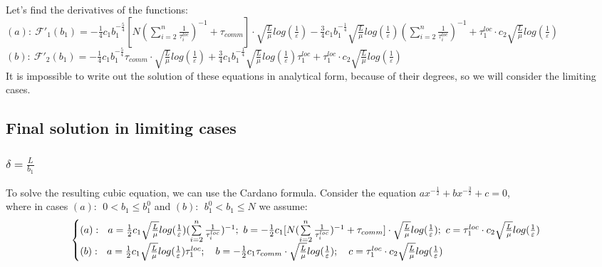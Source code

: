 \documentclass{article}
\begin{document}
Let's find the derivatives of the functions:\\
$(a): ~\mathcal{F'}_1(b_1) = -\frac{1}{4}c_1 b_1^{-\frac{5}{4}}  [N (\sum\limits_{i = 2}^{n} \frac{1}{\tau_i^{loc}})^{-1} + \tau_{comm}]\cdot 
\sqrt{\frac{L}{\mu}}log (\frac{1}{\varepsilon})  - 
\frac{3}{4} c_1 b_1^{-\frac{1}{4}}   \sqrt{\frac{L}{\mu}}log (\frac{1}{\varepsilon})(\sum\limits_{i = 2}^{n} \frac{1}{\tau_i^{loc}})^{-1} +
\tau_1^{loc}\cdot c_2  \sqrt{\frac{L}{\mu}}log (\frac{1}{\varepsilon})$ \\
$(b): ~\mathcal{F'}_2(b_1) = -\frac{1}{4}c_1 b_1^{-\frac{5}{4}} \tau_{comm}\cdot \sqrt{\frac{L}{\mu}}log (\frac{1}{\varepsilon}) + \frac{3}{4} c_1 b_1^{-\frac{1}{4}}  \sqrt{\frac{L}{\mu}}log (\frac{1}{\varepsilon})\tau_1^{loc}   + \tau_1^{loc}\cdot c_2  \sqrt{\frac{L}{\mu}}log (\frac{1}{\varepsilon})$\\

It is impossible to write out the solution of these equations in analytical form, because of their degrees, so we will consider the limiting cases.

\subsection{Final solution in limiting cases}
\subsubsection{$\delta = \frac{L}{b_1}$}\label{eq:3.4.1}
To solve the resulting cubic equation, we can use the Cardano formula.
Consider the equation $ax^{-\frac{1}{2}} + bx^{-\frac{3}{2}} + c = 0$,\\
where in cases $(a): ~ ~ 0 < b_1 \leq b_1^0 $ and $(b): ~ ~ b_1^0 <  b_1 \leq N$ we assume:
\begin{eqnarray}
\notag
    \begin{cases}
    (a): ~ ~ a = \frac{1}{2} c_1 \sqrt{\frac{L}{\mu}}log (\frac{1}{\varepsilon})(\sum\limits_{i = 2}^{n} \frac{1}{\tau_i^{loc}})^{-1}; ~
b = -\frac{1}{2} c_1 [N (\sum\limits_{i = 2}^{n} \frac{1}{\tau_i^{loc}})^{-1} + \tau_{comm}]\cdot 
\sqrt{\frac{L}{\mu}}log (\frac{1}{\varepsilon}); ~ 
c = \tau_1^{loc}\cdot c_2  \sqrt{\frac{L}{\mu}}log (\frac{1} {\varepsilon})
    \\
\notag
    (b): ~ ~ a = \frac{1}{2} c_1  \sqrt{\frac{L}{\mu}}log (\frac{1}{\varepsilon})\tau_1^{loc}; \quad 
b = -\frac{1}{2}c_1 \tau_{comm}\cdot \sqrt{\frac{L}{\mu}}log (\frac{1}{\varepsilon}); \quad 
c = \tau_1^{loc}\cdot c_2  \sqrt{\frac{L}{\mu}}log (\frac{1} {\varepsilon})
    \end{cases}\,
\end{eqnarray}
\end{document}
